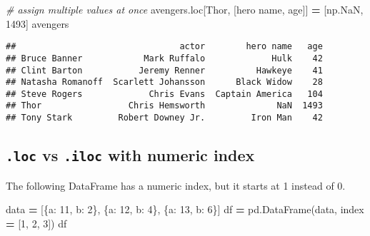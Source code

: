 \documentclass[
]{book}
\newenvironment{Shaded}{\begin{snugshade}}{\end{snugshade}}
\newcommand{\CommentTok}[1]{\textcolor[rgb]{0.56,0.35,0.01}{\textit{#1}}}
\newcommand{\DecValTok}[1]{\textcolor[rgb]{0.00,0.00,0.81}{#1}}
\newcommand{\NormalTok}[1]{#1}
\newcommand{\OperatorTok}[1]{\textcolor[rgb]{0.81,0.36,0.00}{\textbf{#1}}}
\newcommand{\StringTok}[1]{\textcolor[rgb]{0.31,0.60,0.02}{#1}}
\begin{document}
\begin{Shaded}
\begin{Highlighting}[]
\CommentTok{\# assign multiple values at once}
\NormalTok{avengers.loc[}\StringTok{\textquotesingle{}Thor\textquotesingle{}}\NormalTok{, [}\StringTok{\textquotesingle{}hero name\textquotesingle{}}\NormalTok{, }\StringTok{\textquotesingle{}age\textquotesingle{}}\NormalTok{]] }\OperatorTok{=}\NormalTok{ [np.NaN, }\DecValTok{1493}\NormalTok{]}
\NormalTok{avengers}
\end{Highlighting}
\end{Shaded}

\begin{verbatim}
##                                actor        hero name   age
## Bruce Banner            Mark Ruffalo             Hulk    42
## Clint Barton           Jeremy Renner          Hawkeye    41
## Natasha Romanoff  Scarlett Johansson      Black Widow    28
## Steve Rogers             Chris Evans  Captain America   104
## Thor                 Chris Hemsworth              NaN  1493
## Tony Stark         Robert Downey Jr.         Iron Man    42
\end{verbatim}

\hypertarget{loc-vs-.iloc-with-numeric-index}{%
\subsection{\texorpdfstring{\texttt{.loc} vs \texttt{.iloc} with numeric index}{.loc vs .iloc with numeric index}}\label{loc-vs-.iloc-with-numeric-index}}

The following DataFrame has a numeric index, but it starts at 1 instead of 0.

\begin{Shaded}
\begin{Highlighting}[]
\NormalTok{data }\OperatorTok{=}\NormalTok{ [\{}\StringTok{\textquotesingle{}a\textquotesingle{}}\NormalTok{: }\DecValTok{11}\NormalTok{, }\StringTok{\textquotesingle{}b\textquotesingle{}}\NormalTok{: }\DecValTok{2}\NormalTok{\},}
\NormalTok{        \{}\StringTok{\textquotesingle{}a\textquotesingle{}}\NormalTok{: }\DecValTok{12}\NormalTok{, }\StringTok{\textquotesingle{}b\textquotesingle{}}\NormalTok{: }\DecValTok{4}\NormalTok{\},}
\NormalTok{        \{}\StringTok{\textquotesingle{}a\textquotesingle{}}\NormalTok{: }\DecValTok{13}\NormalTok{, }\StringTok{\textquotesingle{}b\textquotesingle{}}\NormalTok{: }\DecValTok{6}\NormalTok{\}]}
\NormalTok{df }\OperatorTok{=}\NormalTok{ pd.DataFrame(data, index }\OperatorTok{=}\NormalTok{ [}\DecValTok{1}\NormalTok{, }\DecValTok{2}\NormalTok{, }\DecValTok{3}\NormalTok{])}
\NormalTok{df}
\end{Highlighting}
\end{Shaded}
\end{document}
